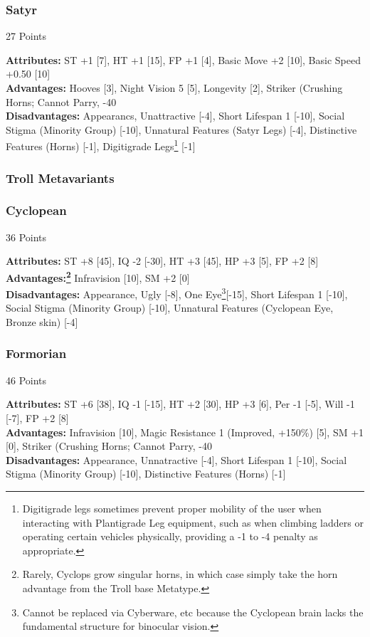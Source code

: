 \begin{multicols*}{3}
	\subsubsection*{Satyr}
	\begin{flushright}
		27 Points
	\end{flushright}
	\textbf{Attributes:} 
	ST +1 [7], HT +1 [15], FP +1 [4], Basic Move +2 [10], Basic Speed +0.50 [10]
	\\\textbf{Advantages:} 
	Hooves [3], Night Vision 5 [5], Longevity [2], Striker (Crushing Horns; Cannot Parry, -40%
	\\\textbf{Disadvantages:} 
	Appearancs, Unattractive [-4], Short Lifespan 1 [-10], Social Stigma (Minority Group) [-10], Unnatural Features (Satyr Legs) [-4], Distinctive Features (Horns) [-1], Digitigrade Legs\footnote{Digitigrade legs sometimes prevent proper mobility of the user when interacting with Plantigrade Leg equipment, such as when climbing ladders or operating certain vehicles physically, providing a -1 to -4 penalty as appropriate.} [-1]
	
	\subsubsection{Troll Metavariants}
	
	\subsubsection*{Cyclopean}
	\begin{flushright}
		36 Points
	\end{flushright}
	\textbf{Attributes:} 
	ST +8 [45], IQ -2 [-30], HT +3 [45], HP +3 [5], FP +2 [8]
	\\\textbf{Advantages:\footnote{Rarely, Cyclops grow singular horns, in which case simply take the horn advantage from the Troll base Metatype.}} 
	Infravision [10], SM +2 [0]
	\\\textbf{Disadvantages:} 
	Appearance, Ugly [-8], One Eye\footnote{Cannot be replaced via  Cyberware, etc because the Cyclopean brain lacks the fundamental structure for binocular vision.}[-15], Short Lifespan 1 [-10], Social Stigma (Minority Group) [-10], Unnatural Features (Cyclopean Eye, Bronze skin) [-4]
	
	\subsubsection*{Formorian}
	\begin{flushright}
		46 Points
	\end{flushright}
	\textbf{Attributes:} 
	ST +6 [38], IQ -1 [-15], HT +2 [30], HP +3 [6], Per -1 [-5], Will -1 [-7], FP +2 [8]
	\\\textbf{Advantages:} 
	Infravision [10], Magic Resistance 1 (Improved, +150\%)  [5], SM +1 [0], Striker (Crushing Horns; Cannot Parry, -40%
	\\\textbf{Disadvantages:} 
	Appearance, Unnatractive [-4], Short Lifespan 1 [-10], Social Stigma (Minority Group) [-10], Distinctive Features (Horns) [-1]
	

\end{multicols*}

